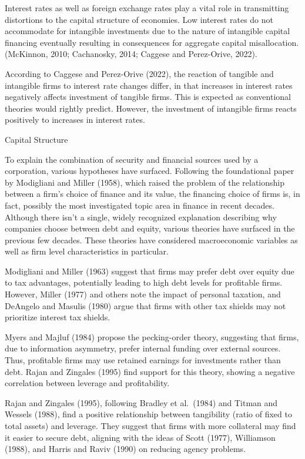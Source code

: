 \documentclass[11pt]{article}
\begin{document}
Interest rates as well as foreign exchange rates play a vital role in
transmitting distortions to the capital structure of economies. Low
interest rates do not accommodate for intangible investments due to the
nature of intangible capital financing eventually resulting in
consequences for aggregate capital misallocation. (McKinnon, 2010;
Cachanosky, 2014; Caggese and Perez-Orive, 2022).

According to Caggese and Perez-Orive (2022), the reaction of tangible
and intangible firms to interest rate changes differ, in that increases
in interest rates negatively affects investment of tangible firms. This
is expected as conventional theories would rightly predict. However, the
investment of intangible firms reacts positively to increases in
interest rates.

Capital Structure

To explain the combination of security and financial sources used by a
corporation, various hypotheses have surfaced. Following the
foundational paper by Modigliani and Miller (1958), which raised the
problem of the relationship between a firm's choice of finance and its
value, the financing choice of firms is, in fact, possibly the most
investigated topic area in finance in recent decades. Although there
isn't a single, widely recognized explanation describing why companies
choose between debt and equity, various theories have surfaced in the
previous few decades. These theories have considered macroeconomic
variables as well as firm level characteristics in particular.

Modigliani and Miller (1963) suggest that firms may prefer debt over
equity due to tax advantages, potentially leading to high debt levels
for profitable firms. However, Miller (1977) and others note the impact
of personal taxation, and DeAngelo and Masulis (1980) argue that firms
with other tax shields may not prioritize interest tax shields.

Myers and Majluf (1984) propose the pecking-order theory, suggesting
that firms, due to information asymmetry, prefer internal funding over
external sources. Thus, profitable firms may use retained earnings for
investments rather than debt. Rajan and Zingales (1995) find support for
this theory, showing a negative correlation between leverage and
profitability.

Rajan and Zingales (1995), following Bradley et al.~(1984) and Titman
and Wessels (1988), find a positive relationship between tangibility
(ratio of fixed to total assets) and leverage. They suggest that firms
with more collateral may find it easier to secure debt, aligning with
the ideas of Scott (1977), Williamson (1988), and Harris and Raviv
(1990) on reducing agency problems.
\end{document}
